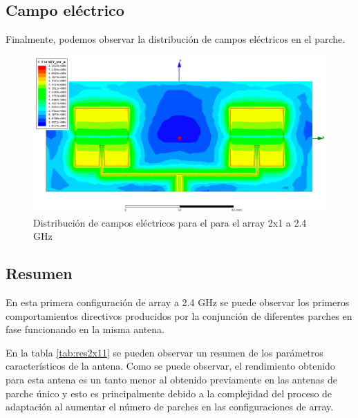 \subsection{Campo eléctrico}
\par Finalmente, podemos observar la distribución de campos eléctricos en el parche. 

\begin{figure}[H]
    \centering
        \includegraphics[width=\textwidth]{archivos/analisis/2x11/8}
        \caption{Distribución de campos eléctricos para el para el array 2x1 a 2.4 GHz}
        \label{fig:elec2x11}
\end{figure}

\subsection{Resumen}
\par En esta primera configuración de array a 2.4 GHz se puede observar los primeros comportamientos directivos producidos por la conjunción de diferentes parches en fase funcionando en la misma antena. 
\\
\par En la tabla \ref{tab:res2x11} se pueden observar un resumen de los parámetros característicos de la antena. Como se puede observar, el rendimiento obtenido para esta antena es un tanto menor al obtenido previamente en las antenas de parche único y esto es principalmente debido a la complejidad del proceso de adaptación al aumentar el número de parches en las configuraciones de array.

